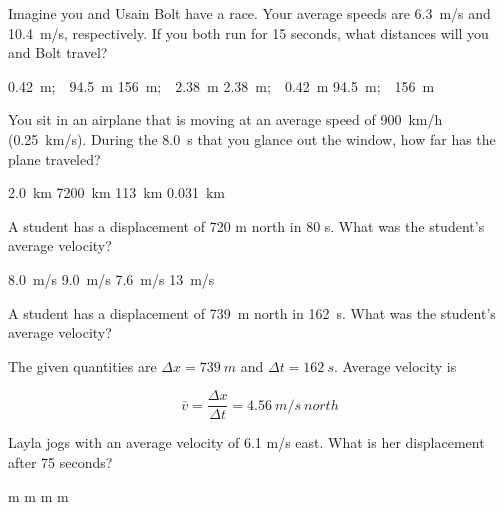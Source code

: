 \documentclass[]{exam}
\begin{document}
\begin{questions}
\question
Imagine you and Usain Bolt have a race. Your average speeds are \SI{6.3}{m/s} and \SI{10.4}{m/s}, respectively. If you both run for 15 seconds, what distances will you and Bolt travel?

\begin{choices}
    \choice  \SI{0.42}{m};\ \ \SI{94.5}{m}
    \choice  \SI{156}{m};\ \ \SI{2.38}{m}
    \choice  \SI{2.38}{m};\ \ \SI{0.42}{m}
    \correctchoice \SI{94.5}{m};\ \ \SI{156}{m} 
\end{choices}

\question %
You sit in an airplane that is moving at an average speed of 
\SI{900}{km/h} (\SI{0.25}{km/s}). During the \SI{8.0}{s}
that you glance out the window, how far has the plane traveled?

\begin{choices}
\CorrectChoice \SI{2.0}{km}
\choice \SI{7200}{km}
\choice \SI{113}{km}
\choice \SI{0.031}{km}
\end{choices}


\clearpage

\question %
A student has a displacement of 720 m north in 80 s. What was the student's average velocity?

\begin{choices}
\choice \SI{8.0}{m/s}
\CorrectChoice \SI{9.0}{m/s}
\choice \SI{7.6}{m/s}
\choice \SI{13}{m/s}
\end{choices}


\question
A student has a displacement of \SI{739}{m} north in \SI{162}{s}. What was the student's average velocity?

\begin{solution}
    The given quantities are $\Delta{x} = \SI{739}{m}$ and $\Delta{t} = \SI{162}{s}$. Average velocity is

\begin{equation*}
        \bar{v} = \frac{\Delta{x}}{\Delta{t}} = \SI{4.56}{m/s\ north}
\end{equation*}
\end{solution}



\question %
Layla jogs with an average velocity of 6.1 m/s east. What is her displacement after 75 seconds?

\begin{choices}
 m
 m
 m
 m
\end{choices}



\end{questions}
\end{document}
